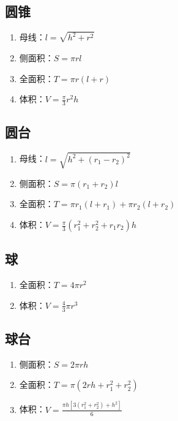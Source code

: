 \begin{spacing}{0.1}
\subsection*{圆锥}
\begin{spacing}{0.1}
	\begin{enumerate}
		\item 母线：$\displaystyle l=\sqrt{h^2+r^2}$
		\item 侧面积：$\displaystyle S=\pi rl$
		\item 全面积：$\displaystyle T=\pi r(l+r)$
		\item 体积：$\displaystyle V=\frac{\pi}{3} r^2h$
	\end{enumerate}
\end{spacing}
\subsection*{圆台}
\begin{spacing}{0.1}
	\begin{enumerate}
		\item 母线：$\displaystyle l=\sqrt{h^2+(r_1-r_2)^2}$
		\item 侧面积：$\displaystyle S=\pi(r_1+r_2)l$
		\item 全面积：$\displaystyle T=\pi r_1(l+r_1)+\pi r_2(l+r_2)$
		\item 体积：$\displaystyle V=\frac{\pi}{3}(r_1^2+r_2^2+r_1r_2)h$
	\end{enumerate}
\end{spacing}
\subsection*{球}
\begin{spacing}{0.1}
	\begin{enumerate}
		\item 全面积：$\displaystyle T=4\pi r^2$
		\item 体积：$\displaystyle V=\frac{4}{3}\pi r^3$
	\end{enumerate}
\end{spacing}
\subsection*{球台}
\begin{spacing}{0.1}
	\begin{enumerate}
		\item 侧面积：$\displaystyle S=2\pi rh$
		\item 全面积：$\displaystyle T=\pi(2rh+r_1^2+r_2^2)$
		\item 体积：$\displaystyle V=\frac{\pi h[3(r_1^2+r_2^2)+h^2]}{6}$
	\end{enumerate}
\end{spacing}

\end{spacing}
